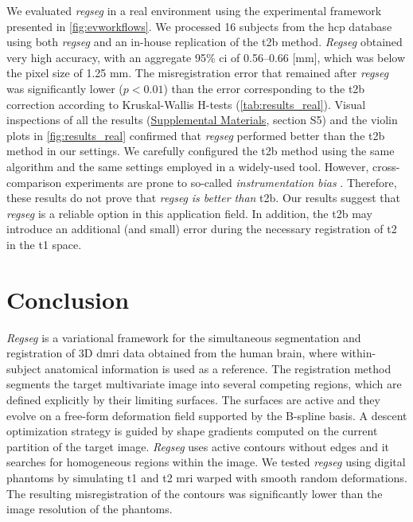 \documentclass[3p,authoryear,fleqn]{elsarticle}
\providecommand{\regseg}{\emph{regseg}}
\providecommand{\Regseg}{\emph{Regseg}}
\providecommand{\suppl}[1]{\href{http://figshare.com/s/459c26b4ee8211e493b306ec4bbcf141}{Supplemental Materials}, #1}
\begin{document}
We evaluated \regseg{} in a real environment using the experimental framework presented
  in \autoref{fig:evworkflows}.
We processed 16 subjects from the \gls*{hcp} database using both \regseg{}
  and an in-house replication of the \acrfull*{t2b} method.
\Regseg{} obtained very high accuracy, with an aggregate 95\% \gls*{ci} of 0.56--0.66 [mm], which was
  below the pixel size of 1.25 mm.
The misregistration error that remained after \regseg{} was significantly lower ($p < 0.01$) than the
  error corresponding to the \gls*{t2b} correction according to Kruskal-Wallis H-tests
  (\autoref{tab:results_real}).
Visual inspections of all the results (\suppl{section S5}) and the violin plots in
  \autoref{fig:results_real} confirmed that \regseg{} performed better than the \gls*{t2b} method
  in our settings.
We carefully configured the \gls*{t2b} method using the same algorithm and the 
  same settings employed in a widely-used tool.
However, cross-comparison experiments are prone to so-called \emph{instrumentation bias}
  \citep{tustison_instrumentation_2013}.
Therefore, these results do not prove that \regseg{} \emph{is better than} \gls*{t2b}.
Our results suggest that \regseg{} is a reliable option in this application field.
In addition, the \gls*{t2b} may introduce an additional (and small) error during the necessary
  registration of \gls*{t2} in the \gls*{t1} space.



\makeatletter{}\section*{Conclusion}
\label{sec:conclusion}

\Regseg{} is a variational framework for the simultaneous segmentation and
  registration of 3D \gls*{dmri} data obtained from the human brain, where within-subject
  anatomical information is used as a reference.
The registration method segments the target multivariate image into several competing regions, which are
  defined explicitly by their limiting surfaces.
The surfaces are active and they evolve on a free-form deformation field supported by the B-spline basis.
A descent optimization strategy is guided by shape gradients computed on the current partition
  of the target image.
\Regseg{} uses active contours without edges and it searches for
  homogeneous regions within the image.
We tested \regseg{} using digital phantoms by simulating \gls*{t1} and \gls*{t2} \gls*{mri}
  warped with smooth random deformations.
The resulting misregistration of the contours was significantly lower than the image resolution
  of the phantoms.
\end{document}
